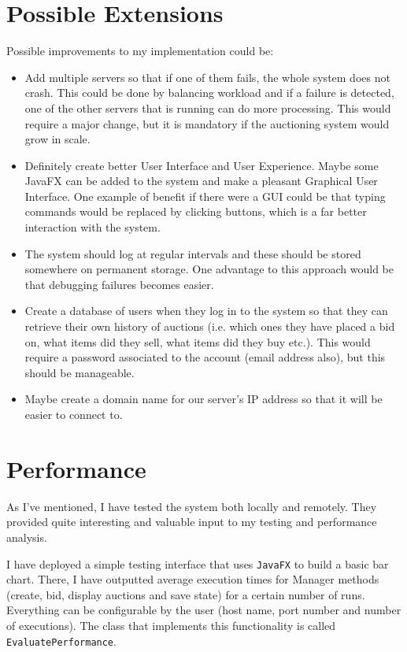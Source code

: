 \documentclass[11pt]{article}
\begin{document}
\section*{Possible Extensions}
 Possible improvements to my implementation could be:
 \begin{itemize}
     \item Add multiple servers so that if one of them fails, the whole system does not crash. This could be done by balancing workload and if a failure is detected, one of the other servers that is running can do more processing. This would require a major change, but it is mandatory if the auctioning system would grow in scale.
     \item Definitely create better User Interface and User Experience. Maybe some JavaFX can be added to the system and make a pleasant Graphical User Interface. One example of benefit if there were a GUI could be that typing commands would be replaced by clicking buttons, which is a far better interaction with the system.
     \item The system should log at regular intervals and these should be stored somewhere on permanent storage. One advantage to this approach would be that debugging failures becomes easier.
     \item Create a database of users when they log in to the system so that they can retrieve their own history of auctions (i.e. which ones they have placed a bid on, what items did they sell, what items did they buy etc.). This would require a password associated to the account (email address also), but this should be manageable.
     \item Maybe create a domain name for our server's IP address so that it will be easier to connect to.
 \end{itemize}

\section*{Performance}
	As I've mentioned, I have tested the system both locally and remotely. They provided quite interesting and valuable input to my testing and performance analysis.
	
	I have deployed a simple testing interface that uses \texttt{JavaFX} to build a basic bar chart. There, I have outputted average execution times for Manager methods (create, bid, display auctions and save state) for a certain number of runs. Everything can be configurable by the user (host name, port number and number of executions). The class that implements this functionality is called \texttt{EvaluatePerformance}.
	
\end{document}
